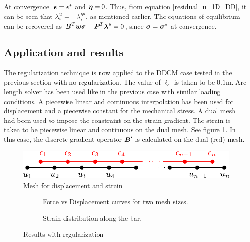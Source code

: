 \documentclass[11pt]{elsarticle}
\begin{document}
At convergence, $\mbox{\boldmath $\epsilon$}=\mbox{\boldmath $\epsilon$}^*$ and $\mbox{\boldmath $\eta$}=0$. Thus, from equation \ref{residual_u_1D_DD}, it can be seen that $\lambda^u_i = -\lambda^{\eta u}_i$, as mentioned earlier. The equations of equilibrium can be recovered as $\mbox{\boldmath $B$}^T \mbox{\boldmath $w$} \mbox{\boldmath $\sigma$} +\mbox{\boldmath $P$}^T \mbox{\boldmath $\lambda$}^{u} =0$, since $\mbox{\boldmath $\sigma$} = \mbox{\boldmath $\sigma$}^*$ at convergence.

\subsection{Application and results}
The regularization technique is now applied to the DDCM case tested in the previous section with no regularization. The value of $\ell_c$ is taken to be $0.1\si{\meter}$. Arc length solver has been used like in the previous case with similar loading conditions. A piecewise linear and continuous interpolation has been used for displacement and a piecewise constant for the mechanical stress. A dual mesh had been used to impose the constraint on the strain gradient. The strain is taken to be piecewise linear and continuous on the dual mesh. See figure \ref{mesh_dual_1d}. In this case, the discrete gradient operator $\mbox{\boldmath $B$}'$ is calculated on the dual (red) mesh.

\begin{figure}[ht]
	\centering
	\includegraphics[width=0.5\linewidth]{./mesh_dual_1d.pdf}
	\caption{Mesh for displacement and strain}
	\label{mesh_dual_1d}
\end{figure}



\begin{figure}[ht]
	\begin{subfigure}{0.45\textwidth}
		\centering
		
		\caption{Force vs Displacement curves for two mesh sizes.}
		\label{force_disp_nonlocal}
	\end{subfigure}
	\hfill
	\begin{subfigure}{0.45\textwidth}
		\centering
		
		\caption{Strain distribution along the bar.}
		\label{strain_dist_nonlocal}
	\end{subfigure}
	\caption{Results with regularization}
	\label{fig:Results_with_regularization}
\end{figure}
\end{document}
